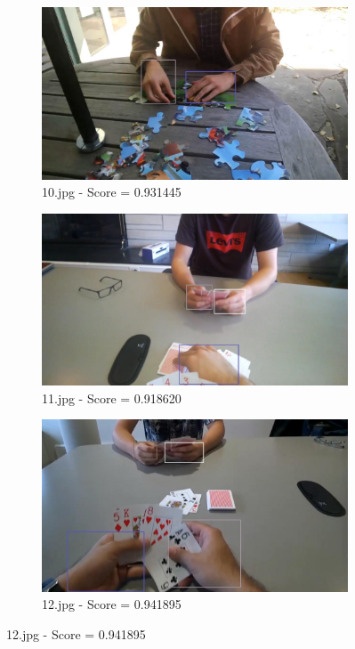 \begin{figure}[!h]
\begin{subfigure}[b]{0.3\textwidth}
    \end{subfigure}
       
    \begin{subfigure}[b]{0.3 \textwidth}
        \centering
        \includegraphics[width=\textwidth]{images/handDetection/10.jpg}
        \caption{10.jpg - Score = 0.931445}
        
    \end{subfigure}
    \hfill
    \begin{subfigure}[b]{0.3\textwidth}
        \centering
        \includegraphics[width=\textwidth]{images/handDetection/11.jpg}
        \caption{11.jpg - Score = 0.918620}
        
    \end{subfigure}
    \hfill
    \begin{subfigure}[b]{0.3\textwidth}
        \centering
        \includegraphics[width=\textwidth]{images/handDetection/12.jpg}
        \caption{12.jpg - Score = 0.941895}
        

\end{subfigure}
\end{figure}
